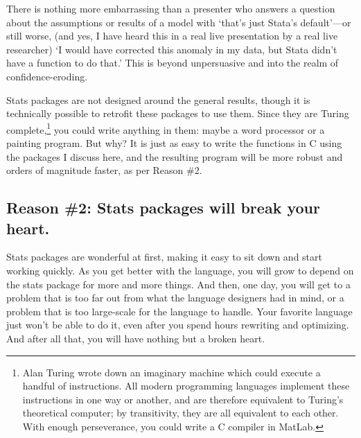 {There is nothing more embarrassing than a presenter who answers a question
about the assumptions or results of a model with `that's just Stata's
default'---or still worse, (and yes, I have heard this in a real live
presentation by a real live researcher) `I would have corrected this
anomaly in my data, but Stata didn't have a function to do that.' This
is beyond unpersuasive and into the realm of confidence-eroding.

Stats packages are not designed around the general results, though
it is technically possible to retrofit these packages to use them. Since
they are Turing complete,\footnote{Alan Turing wrote down an imaginary
machine which could execute a handful of instructions.  All
modern programming languages implement these instructions in one way or
another, and are therefore equivalent to Turing's theoretical computer;
by transitivity, they are all equivalent to each other. With enough
perseverance, you could write a C compiler in MatLab.} you could
write anything in them: maybe a word processor or a painting program. But
why? It is just as easy to write the functions in C using the packages I discuss
here, and the resulting program will be more robust and orders of
magnitude faster, as per Reason \#2.
	\fi

\subsection{Reason \#2: Stats packages will break your heart.} Stats packages
are wonderful at first, making it easy to sit down and start working
quickly. As you get better with the language, you will 
grow to depend on the stats package for more and more
things. And then, one day, you will get to a problem that is too far
out from what the language designers had in mind, or a problem that is
too large-scale for the language to handle. Your favorite language just
won't be able to do it, even after you spend hours rewriting and
optimizing.  And after all that, you will have nothing but a broken heart.

}
